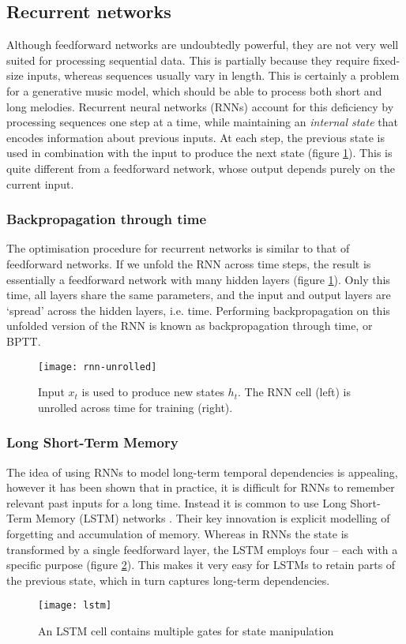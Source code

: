 \documentclass[../../report.tex]{subfiles}
\begin{document}
\subsection{Recurrent networks}

Although feedforward networks are undoubtedly powerful, they are not very well
suited for processing sequential data. This is partially because they require
fixed-size inputs, whereas sequences usually vary in length. This is certainly a
problem for a generative music model, which should be able to process both short
and long melodies. Recurrent neural networks (RNNs) account for this deficiency
by processing sequences one step at a time, while maintaining an \emph{internal
state} that encodes information about previous inputs. At each step, the
previous state is used in combination with the input to produce the next state
(figure \ref{fig:rnn-unrolled}). This is quite different from a feedforward
network, whose output depends purely on the current input.

\subsubsection{Backpropagation through time}
The optimisation procedure for recurrent networks is similar to that of
feedforward networks. If we unfold the RNN across time steps, the result is
essentially a feedforward network with many\footnotemark{} hidden layers (figure
\ref{fig:rnn-unrolled}). Only this time, all layers share the same parameters,
and the input and output layers are `spread' across the hidden layers, i.e.
time. Performing backpropagation on this unfolded version of the RNN is known as
backpropagation through time, or BPTT.


\begin{figure}
  \centering
  \texttt{[image: rnn-unrolled]}
  \caption{Input $x_t$ is used to produce new states $h_t$. The RNN cell (left)
  is unrolled across time for training (right). \cite{Olah2015LSTM}}
  \label{fig:rnn-unrolled}
\end{figure}

\subsubsection{Long Short-Term Memory}
The idea of using RNNs to model long-term temporal dependencies is appealing,
however it has been shown \cite{Bengio1994} that in practice, it is difficult
for RNNs to remember relevant past inputs for a long time. Instead it is common
to use Long Short-Term Memory (LSTM) networks \cite{Hochreiter1997}. Their key
innovation is explicit modelling of forgetting and accumulation of memory.
Whereas in RNNs the state is transformed by a single feedforward layer, the LSTM
employs four -- each with a specific purpose (figure \ref{fig:lstm}). This makes
it very easy for LSTMs to retain parts of the previous state, which in turn
captures long-term dependencies.

\begin{figure}
  \centering
  \texttt{[image: lstm]}
  \caption{An LSTM cell contains multiple gates for state manipulation \cite{Olah2015LSTM}}
  \label{fig:lstm}
\end{figure}
\end{document}
